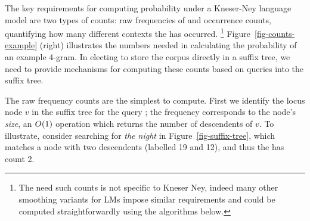 
The key requirements for computing probability under a Kneser-Ney language model are two types of counts: raw frequencies of \ngrams and occurrence counts, quantifying how many different contexts the \ngram has occurred.%
\footnote{The need such counts is not specific to Kneser Ney, indeed
  many other smoothing variants for \ngram LMs impose similar
  requirements and could be computed straightforwardly using the algorithms below.}
Figure~\ref{fig-counts-example} (right) illustrates the numbers needed in calculating the probability of an example 4-gram.
In electing to store the corpus directly in a suffix tree, we need to provide mechanisms for computing these counts based on queries into the suffix tree.

The raw frequency counts are the simplest to compute. First we
identify the locus node $v$ in the suffix tree for the query
\ngram; the frequency corresponds to the node's \emph{size}, an $O(1)$ 
operation which returns the number of descendents of $v$. To illustrate, consider
searching for \emph{the night} in  Figure~\ref{fig-suffix-tree}, which
matches a node with two descendents (labelled 19 and 12), and thus the
\ngram has count 2. 

